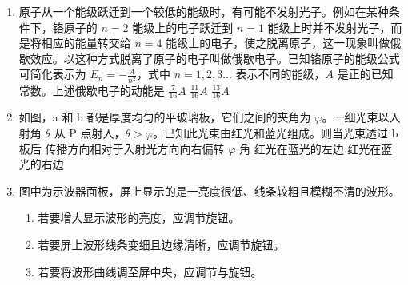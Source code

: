 \documentclass[\gkver]{gaokaozhenti}
\begin{document}
\begin{enumerate}
\item
原子从一个能级跃迁到一个较低的能级时，有可能不发射光子。例如在某种条件下，铬原子的 $n=2$ 能级上的电子跃迁到 $n=1$ 能级上时并不发射光子，而是将相应的能量转交给 $n=4$ 能级上的电子，使之脱离原子，这一现象叫做俄歇效应。以这种方式脱离了原子的电子叫做俄歇电子。已知铬原子的能级公式可简化表示为 $E_{n}=-\frac{A}{n^{2}}$，式中 $n=1,2,3\ldots$ 表示不同的能级，$A$ 是正的已知常数。上述俄歇电子的动能是
{$\frac{7}{16}A$}
{$\frac{11}{16}A$}
{$\frac{13}{16}A$}

\item
如图，a 和 b 都是厚度均匀的平玻璃板，它们之间的夹角为 $\varphi$。一细光束以入射角 $\theta$ 从 P 点射入，$\theta>\varphi$。已知此光束由红光和蓝光组成。则当光束透过 b 板后
\onepicture[w=4.20cm]{}
{传播方向相对于入射光方向向右偏转 $\varphi$ 角}
{红光在蓝光的左边}
{红光在蓝光的右边}

\item
图中为示波器面板，屏上显示的是一亮度很低、线条较粗且模糊不清的波形。
\begin{enumerate}
	\item
	若要增大显示波形的亮度，应调节旋钮。
	\item
	若要屏上波形线条变细且边缘清晰，应调节旋钮。
	\item
	若要将波形曲线调至屏中央，应调节与旋钮。
\end{enumerate}


\end{enumerate}
\end{document}
